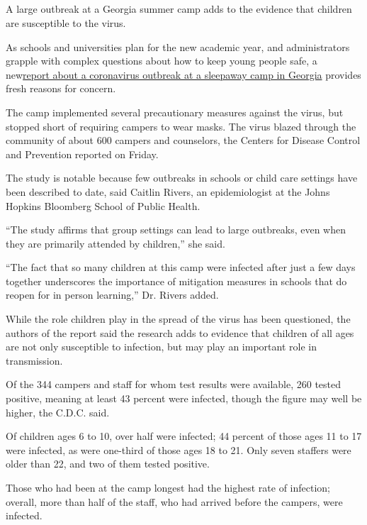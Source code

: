 \hypertarget{-6}{%
\subsection{}\label{-6}}

A large outbreak at a Georgia summer camp adds to the evidence that
children are susceptible to the virus.

As schools and universities plan for the new academic year, and
administrators grapple with complex questions about how to keep young
people safe, a
new\href{https://www.cdc.gov/mmwr/volumes/69/wr/mm6931e1.htm?s_cid=mm6931e1_w}{report
about a coronavirus outbreak at a sleepaway camp in Georgia} provides
fresh reasons for concern.

The camp implemented several precautionary measures against the virus,
but stopped short of requiring campers to wear masks. The virus blazed
through the community of about 600 campers and counselors, the Centers
for Disease Control and Prevention reported on Friday.

The study is notable because few outbreaks in schools or child care
settings have been described to date, said Caitlin Rivers, an
epidemiologist at the Johns Hopkins Bloomberg School of Public Health.

``The study affirms that group settings can lead to large outbreaks,
even when they are primarily attended by children,'' she said.

``The fact that so many children at this camp were infected after just a
few days together underscores the importance of mitigation measures in
schools that do reopen for in person learning,'' Dr. Rivers added.

While the role children play in the spread of the virus has been
questioned, the authors of the report said the research adds to evidence
that children of all ages are not only susceptible to infection, but may
play an important role in transmission.

Of the 344 campers and staff for whom test results were available, 260
tested positive, meaning at least 43 percent were infected, though the
figure may well be higher, the C.D.C. said.

Of children ages 6 to 10, over half were infected; 44 percent of those
ages 11 to 17 were infected, as were one-third of those ages 18 to 21.
Only seven staffers were older than 22, and two of them tested positive.

Those who had been at the camp longest had the highest rate of
infection; overall, more than half of the staff, who had arrived before
the campers, were infected.

